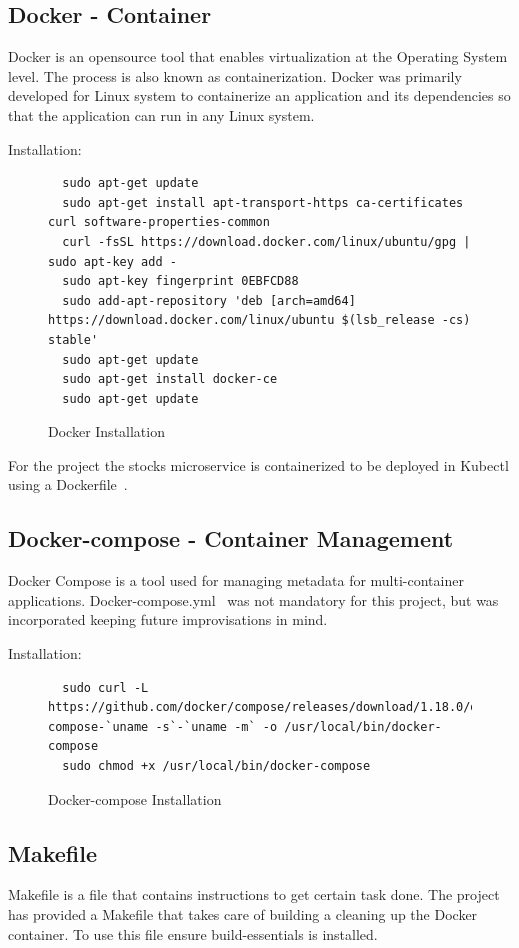 \subsection{Docker - Container}
Docker is an opensource tool that enables virtualization at the Operating
System level. The process is also known as containerization. Docker was
primarily developed for Linux system to containerize an application and its
dependencies so that the application can run in any Linux system.

Installation:
\begin{figure}[htb]
\begin{footnotesize}
\begin{verbatim}
  sudo apt-get update
  sudo apt-get install apt-transport-https ca-certificates curl software-properties-common
  curl -fsSL https://download.docker.com/linux/ubuntu/gpg | sudo apt-key add -
  sudo apt-key fingerprint 0EBFCD88
  sudo add-apt-repository 'deb [arch=amd64] https://download.docker.com/linux/ubuntu $(lsb_release -cs)  stable'
  sudo apt-get update
  sudo apt-get install docker-ce
  sudo apt-get update
\end{verbatim}
\end{footnotesize}
\caption{Docker Installation}\label{F:setup}
\end{figure}
For the project the stocks microservice is containerized to be deployed in
Kubectl using a Dockerfile~\cite{hid-sp18-417-Dockerfile}.

\subsection{Docker-compose - Container Management}
Docker Compose is a tool used for managing metadata for multi-container
applications. Docker-compose.yml~\cite{hid-sp18-417-docker-compose} was not
mandatory for this project, but was incorporated keeping future improvisations
in mind. 

Installation:

\begin{figure}[htb]
\begin{verbatim}
  sudo curl -L https://github.com/docker/compose/releases/download/1.18.0/docker-compose-`uname -s`-`uname -m` -o /usr/local/bin/docker-compose
  sudo chmod +x /usr/local/bin/docker-compose
\end{verbatim}
\caption{Docker-compose Installation}
\end{figure}

\subsection{Makefile}
Makefile is a file that contains instructions to get certain task done. The
project has provided a Makefile that takes care of building a cleaning up the
Docker container. To use this file ensure build-essentials is installed.

